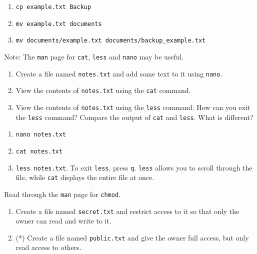 \documentclass[english]{sheet}
\begin{document}
\begin{solution}
    \begin{enumerate}
        \item \texttt{cp example.txt Backup}
        \item \texttt{mv example.txt documents}
        \item \texttt{mv documents/example.txt documents/backup_example.txt}
    \end{enumerate}
\end{solution}

\begin{exercise}[subtitle=Viewing and editing files]
    Note: The \texttt{man} page for \texttt{cat}, \texttt{less} and \texttt{nano} may be useful.
    \begin{enumerate}
        \item Create a file named \texttt{notes.txt} and add some text to it using \texttt{nano}.
        \item View the contents of \texttt{notes.txt} using the \texttt{cat} command.
        \item View the contents of \texttt{notes.txt} using the \texttt{less} command. How can you exit the \texttt{less} command? Compare the output of \texttt{cat} and \texttt{less}. What is different? 
    \end{enumerate}
\end{exercise}

\begin{solution}
    \begin{enumerate}
        \item \texttt{nano notes.txt}
        \item \texttt{cat notes.txt}
        \item \texttt{less notes.txt}. To exit \texttt{less}, press \texttt{q}. \texttt{less} allows you to scroll through the file, while \texttt{cat} displays the entire file at once.
    \end{enumerate}
\end{solution}


\begin{exercise}[subtitle=File permissions with \texttt{chmod}]
    Read through the \texttt{man} page for \texttt{chmod}.
    \begin{enumerate}
        \item Create a file named \texttt{secret.txt} and restrict access to it so that only the owner can read and write to it.
        \item (*) Create a file named \texttt{public.txt} and give the owner full access, but only read access to others.
    \end{enumerate}
\end{exercise}
\end{document}

